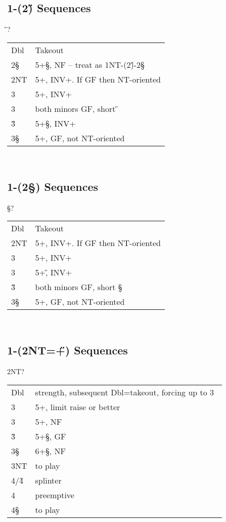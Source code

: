 \subsection{1\D-(2\H) Sequences}

\begin{bidding}
\>\D{}\H\>?
\end{bidding}

\begin{xtabular}{ll}
Dbl & Takeout \\
2\S & 5+\S, NF -- treat as 1NT-(2\H)-2\S\ \\
2NT & 5+\C, INV+. If GF then NT-oriented \\
3\C & 5+\D, INV+ \\
3\D & both minors GF, short \H \\
3\H & 5+\S, INV+ \\
3\S & 5+\C, GF, not NT-oriented \\
\end{xtabular}\\

\subsection{1\D-(2\S) Sequences}

\begin{bidding}
\>\D{}\S\>?
\end{bidding}

\begin{xtabular}{ll}
Dbl & Takeout \\
2NT & 5+\C, INV+. If GF then NT-oriented \\
3\C & 5+\D, INV+ \\
3\D & 5+\H, INV+ \\
3\H & both minors GF, short \S \\
3\S & 5+\C, GF, not NT-oriented \\
\end{xtabular}\\

\subsection{1\D-(2NT=\H+\C) Sequences}

\begin{bidding}
\>\D\>2NT\>?
\end{bidding}

\begin{xtabular}{ll}
Dbl & strength, subsequent Dbl=takeout, forcing up to 3\D\ \\
3\C & 5+\D, limit raise or better \\
3\D & 5+\D, NF \\
3\H & 5+\S, GF \\
3\S & 6+\S, NF \\
3NT & to play \\
4\C/4\H & splinter \\
4\D & preemptive \\
4\S & to play \\
\end{xtabular}\\
